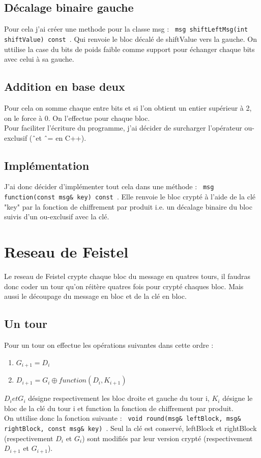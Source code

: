 \documentclass[10pt,a4paper]{article}
\begin{document}
\subsection*{Décalage binaire gauche}
Pour cela j'ai créer une methode pour la classe msg : \verb| msg shiftLeftMsg(int shiftValue) const |. Qui renvoie le bloc décalé de shiftValue vers la gauche. On uttilise la case du bits de poids faible comme support pour échanger chaque bits avec celui à sa gauche.
\subsection*{Addition en base deux}
Pour cela on somme chaque entre bits et si l'on obtient un entier supérieur à 2, on le force à 0. On l'effectue pour chaque bloc.\\
Pour faciliter l'écriture du programme, j'ai décider de surcharger l'opérateur ou-exclusif (\^\ et \^\ = en C++).
\subsection*{Implémentation}
J'ai donc décider d'implémenter tout cela dans une méthode : \verb| msg function(const msg& key) const |. Elle renvoie le bloc crypté à l'aide de la clé "key" par la fonction de chiffrement par produit i.e. un décalage binaire du bloc suivis d'un ou-exclusif avec la clé.
\section{Reseau de Feistel}
Le reseau de Feistel crypte chaque bloc du message en quatres tours, il faudras donc coder un tour qu'on réitère quatres fois pour crypté chaques bloc. Mais aussi le découpage du message en bloc et de la clé en bloc.
\subsection*{Un tour}
Pour un tour on effectue les opérations suivantes dans cette ordre :
\begin{enumerate}
\item $G_{i+1} = D_i$
\item $D_{i+1} = G_{i} \oplus function(D_i, K_{i+1})$\\
\end{enumerate}
$D_i et G_i$ désigne respectivement les bloc droite et gauche du tour i, $K_i$ désigne le bloc de la clé du tour i et function la fonction de chiffrement par produit.\\
On uttilise donc la fonction suivante : \verb| void round(msg& leftBlock, msg& rightBlock, const msg& key) |. Seul la clé est conservé, leftBlock et rightBlock (respectivement $D_i$ et $G_i$) sont modifiés par leur version crypté (respectivement $D_{i+1}$ et $G_{i+1}$).\\
\end{document}
